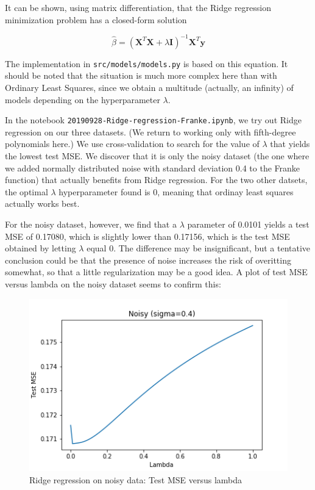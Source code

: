 \documentclass{article}
\begin{document}
It can be shown, using matrix differentiation, that the Ridge regression minimization problem has a closed-form solution

$$
\hat{\beta} = ({\mathbf{X}}^T \mathbf{X} + \lambda\mathbf{I})^{-1} {\mathbf{X}}^T \mathbf{y}
$$

The implementation in \texttt{src/models/models.py} is based on this equation. It should be noted that the situation is much more complex here than with Ordinary Least Squares, since we obtain a multitude (actually, an infinity) of models depending on the hyperparameter $\lambda$.

In the notebook \texttt{20190928-Ridge-regression-Franke.ipynb}, we try out Ridge regression on our three datasets. (We return to working only with fifth-degree polynomials here.) We use cross-validation to search for the value of $\lambda$ that yields the lowest test MSE. We discover that it is only the noisy dataset (the one where we added normally distributed noise with standard deviation 0.4 to the Franke function) that actually benefits from Ridge regression. For the two other datsets, the optimal $\lambda$ hyperparameter found is 0, meaning that ordinay least squares actually works best.

For the noisy dataset, however, we find that a $\lambda$ parameter of 0.0101 yields a test MSE of 0.17080, which is slightly lower than 0.17156, which is the test MSE obtained by letting $\lambda$ equal 0. The difference may be insignificant, but a tentative conclusion could be that the presence of noise increases the risk of overitting somewhat, so that a little regularization may be a good idea. A plot of test MSE versus lambda on the noisy dataset seems to confirm this:

\begin{figure}[H]
    \includegraphics{figures/4_test_mse_noisy_ridge.png}
    \caption{Ridge regression on noisy data: Test MSE versus lambda}
    \label{}
\end{figure}
\end{document}
